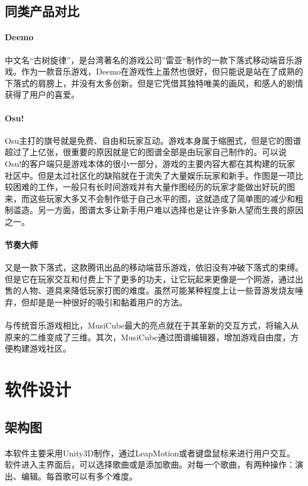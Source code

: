 \documentclass{article}
\begin{document}
\subsection{同类产品对比}
\paragraph{Deemo}
中文名“古树旋律”，是台湾著名的游戏公司”雷亚“制作的一款下落式移动端音乐游戏。作为一款音乐游戏，Deemo在游戏性上虽然也很好，但只能说是站在了成熟的下落式的肩膀上，并没有太多创新。但是它凭借其独特唯美的画风，和感人的剧情获得了用户的喜爱。
\paragraph{Osu!}
Osu主打的旗号就是免费、自由和玩家互动。游戏本身属于缩圈式，但是它的图谱超过了上亿张，很重要的原因就是它的图谱全部是由玩家自己制作的。可以说Osu!的客户端只是游戏本体的很小一部分，游戏的主要内容大都在其构建的玩家社区中。但是太过社区化的缺陷就在于流失了大量娱乐玩家和新手。作图是一项比较困难的工作，一般只有长时间游戏并有大量作图经历的玩家才能做出好玩的图来，而这些玩家大多又不会制作低于自己水平的图，这就造成了简单图的减少和粗制滥造。另一方面，图谱太多让新手用户难以选择也是让许多新人望而生畏的原因之一。
\paragraph{节奏大师}
又是一款下落式，这款腾讯出品的移动端音乐游戏，依旧没有冲破下落式的束缚。但是它在玩家交互和付费上下了更多的功夫，让它玩起来更像是一个网游，通过出售的人物、道具来降低玩家打图的难度。虽然可能某种程度上让一些音游发烧友唾弃，但却是是一种很好的吸引和黏着用户的方法。
\paragraph{}
与传统音乐游戏相比，MusiCube最大的亮点就在于其革新的交互方式，将输入从原来的二维变成了三维。其次，MusiCube通过图谱编辑器，增加游戏自由度，方便构建游戏社区。
\section{软件设计}
\subsection{架构图}
\paragraph{}
本软件主要采用Unity3D制作，通过LeapMotion或者键盘鼠标来进行用户交互。软件进入主界面后，可以选择歌曲或是添加歌曲。对每一个歌曲，有两种操作：演出、编辑。每首歌可以有多个难度。
\end{document}
